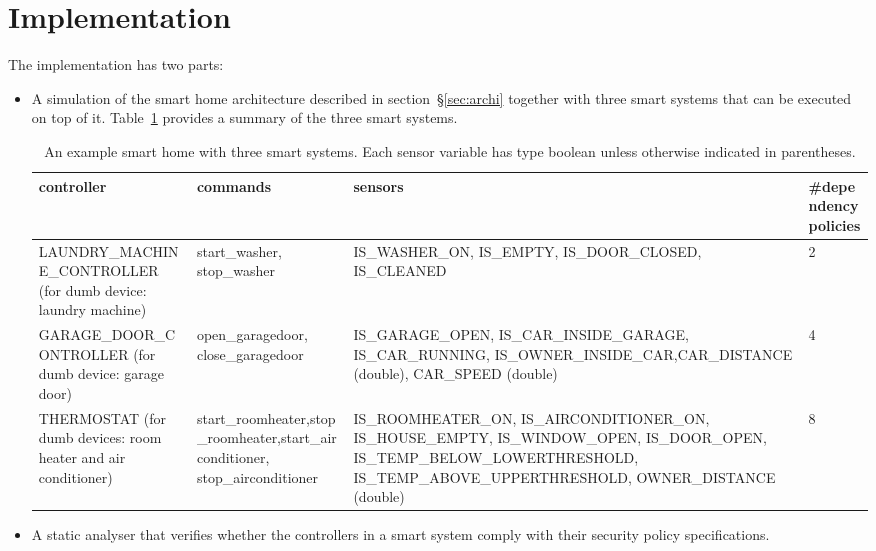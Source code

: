 \documentclass{article}
\begin{document}
\section{Implementation}
\label{sec:impl}
The implementation has two parts: 
\begin{itemize}
\item A simulation of the smart home architecture described in section~\S\ref{sec:archi} together with three smart systems that can be executed on top of it. Table~\ref{table:appliance_sensor} provides a summary of the three smart systems. 
\begin{table}[h]
\begin{center}
\begin{tabular}{|p{4cm}|p{5cm}|p{4.5cm}|p{3cm}|}
\hline
controller & commands & sensors & \#dependency \newline policies \\ \hline
\tiny{LAUNDRY\_MACHINE\_CONTROLLER} \tiny{ (for dumb device: laundry machine)} &
\small start\_washer, \small stop\_washer & 
\tiny{IS\_WASHER\_ON}, \newline \tiny{IS\_EMPTY, \newline IS\_DOOR\_CLOSED, \newline IS\_CLEANED} & 2\\ \hline


\tiny{GARAGE\_DOOR\_CONTROLLER} \tiny{(for dumb device: garage door)} & 
\small{open\_garagedoor, close\_garagedoor}\tiny &  
\tiny{IS\_GARAGE\_OPEN, \newline IS\_CAR\_INSIDE\_GARAGE, \newline IS\_CAR\_RUNNING, \newline IS\_OWNER\_INSIDE\_CAR,\newline CAR\_DISTANCE (double), \newline CAR\_SPEED (double)} & 4\\ \hline

\tiny{THERMOSTAT} \tiny{(for dumb devices: room heater and air conditioner)} & 
\small start\_roomheater,\newline \small stop\_roomheater,\newline\small start\_airconditioner, \newline \small stop\_airconditioner & 
\tiny{IS\_ROOMHEATER\_ON}, \tiny{IS\_AIRCONDITIONER\_ON},
\tiny{IS\_HOUSE\_EMPTY, \newline IS\_WINDOW\_OPEN, \newline IS\_DOOR\_OPEN, IS\_TEMP\_BELOW\_LOWERTHRESHOLD, IS\_TEMP\_ABOVE\_UPPERTHRESHOLD}, \tiny{OWNER\_DISTANCE (double)} & 8\\ \hline
\end{tabular}
\caption{\small{An example smart home with three smart systems. Each sensor variable has type boolean unless otherwise indicated in parentheses.}}
\label{table:appliance_sensor}
\end{center}
\end{table}
\item A static analyser that verifies whether the controllers in a smart system comply with their security policy specifications.
\end{itemize}   
\end{document}
